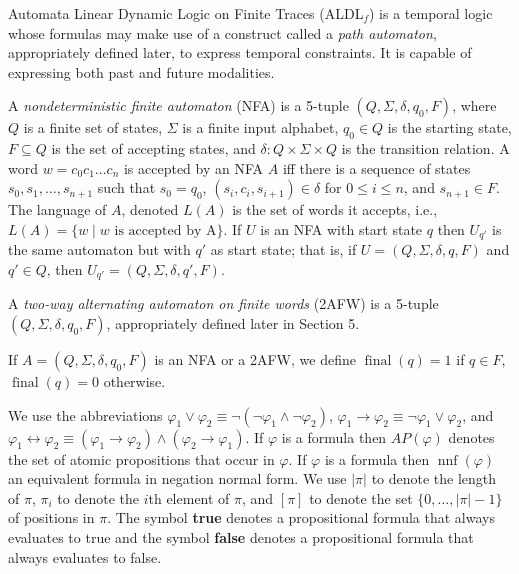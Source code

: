 \documentclass{lmcs}
\theoremstyle{definition}
\DeclareMathOperator{\nnf}{nnf}
\DeclareMathOperator{\?}{?}
\DeclareMathOperator{\final}{final}
\begin{document}
Automata Linear Dynamic Logic on Finite Traces (ALDL$_f$) is a temporal logic whose formulas may make use of a construct called a \textit{path automaton}, appropriately defined later, to express temporal constraints. It is capable of expressing both past and future modalities.

A \textit{nondeterministic finite automaton} (NFA) is a 5-tuple  $(Q,\Sigma, \delta, q_0,F)$, where $Q$ is a finite set of states, $\Sigma$ is a finite input alphabet, $q_0 \in Q$ is the starting state, $F \subseteq Q$ is the set of accepting states, and $\delta : Q \times \Sigma \times Q$ is the transition relation. A word $w = c_0c_1 \ldots c_n$ is accepted by an NFA $A$ iff there is a sequence of states $s_0,s_1,\ldots,s_{n+1}$ such that $s_0 = q_0$, $(s_i, c_i, s_{i+1}) \in \delta$ for $0 \leq i \leq n$, and $s_{n+1} \in F$. The language of $A$, denoted $L(A)$ is the set of words it accepts, i.e., $L(A) = \{ w \mid w \text{ is accepted by A} \}$. If $U$ is an NFA with start state $q$ then $U_{q'}$ is the same automaton but with $q'$ as start state; that is, if $U = (Q,\Sigma,\delta,q,F)$ and $q' \in Q$, then $U_{q'} = (Q,\Sigma,\delta,q',F)$.

A \textit{two-way alternating automaton on finite words} (2AFW) is a 5-tuple $(Q, \Sigma, \delta, q_0, F)$, appropriately defined later in Section 5.

If $A = (Q,\Sigma,\delta,q_0,F)$ is an NFA or a 2AFW, we define $\final(q) = 1$ if $q \in F$, $\final(q) = 0$ otherwise.

We use the abbreviations $\varphi_1 \vee \varphi_2 \equiv \neg(\neg\varphi_1 \wedge \neg\varphi_2)$, $\varphi_1 \rightarrow \varphi_2 \equiv \neg \varphi_1 \vee \varphi_2$,
and $\varphi_1 \leftrightarrow \varphi_2 \equiv (\varphi_1 \rightarrow \varphi_2) \wedge (\varphi_2 \rightarrow \varphi_1)$.
If $\varphi$ is a formula then $AP(\varphi)$ denotes the set of atomic propositions that occur in $\varphi$. If $\varphi$ is a formula then $\nnf(\varphi)$ an equivalent formula in negation normal form.
We use $|\pi|$ to denote the length of $\pi$, $\pi_i$ to denote the $i$th element of $\pi$, and $[\pi]$ to denote the set $\{0,\ldots,|\pi|-1\}$ of positions in $\pi$.
The symbol \textbf{true} denotes a propositional formula that always evaluates to true and the symbol \textbf{false} denotes a propositional formula that always evaluates to false.
\end{document}
